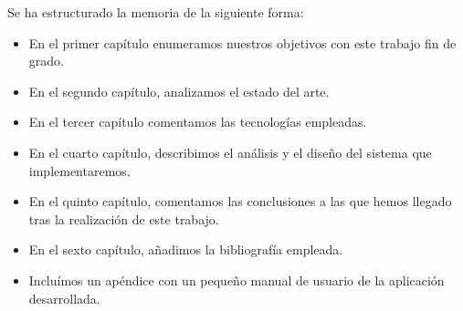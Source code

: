 \documentclass[12pt,a4paper,spanish]{book}
\newcounter{ri}
\begin{document}
 Se ha estructurado la memoria de la siguiente forma:

\begin{itemize}
\item En el primer capítulo enumeramos nuestros objetivos con este trabajo fin de grado.
\item En el segundo capítulo, analizamos el estado del arte.
\item En el tercer capítulo comentamos las tecnologías empleadas.
\item En el cuarto capítulo, describimos el análisis y el diseño del sistema que implementaremos.
\item En el quinto capítulo, comentamos las conclusiones a las que hemos llegado tras la realización de este trabajo.
\item En el sexto capítulo, añadimos la bibliografía empleada.
\item Incluímos un apéndice con un pequeño manual de usuario de la aplicación desarrollada.
\end{itemize}







\end{document}
